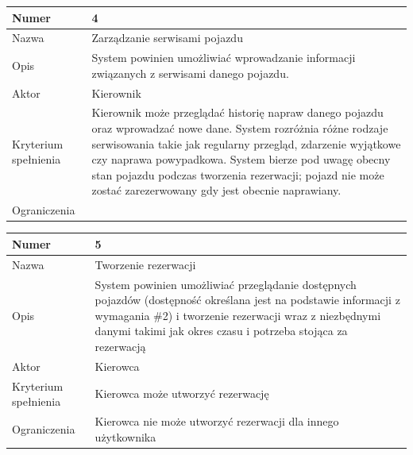 \documentclass[eng,printmode,openany]{mgr}
\begin{document}
	\begin{table}[H]
		\begin{tabularx}{\textwidth}{|l|X|}
			\hline
			Numer                & 4 \\ \hline
			Nazwa                & Zarządzanie serwisami pojazdu \\ \hline
			Opis                 & System powinien umożliwiać wprowadzanie informacji związanych z serwisami danego pojazdu. \\ \hline
			Aktor                & Kierownik \\ \hline
			Kryterium spełnienia & Kierownik może przeglądać historię napraw danego pojazdu oraz wprowadzać nowe dane. System rozróżnia różne rodzaje serwisowania takie jak regularny przegląd, zdarzenie wyjątkowe czy naprawa powypadkowa. System bierze pod uwagę obecny stan pojazdu podczas tworzenia rezerwacji; pojazd nie może zostać zarezerwowany gdy jest obecnie naprawiany. \\ \hline
			Ograniczenia         & \\ \hline
		\end{tabularx}
	\end{table}
	
	\begin{table}[H]
		\begin{tabularx}{\textwidth}{|l|X|}
			\hline
			Numer                & 5 \\ \hline
			Nazwa                & Tworzenie rezerwacji \\ \hline
			Opis                 & System powinien umożliwiać przeglądanie dostępnych pojazdów (dostępność określana jest na podstawie informacji z wymagania \#2) i tworzenie rezerwacji wraz z niezbędnymi danymi takimi jak okres czasu i potrzeba stojąca za rezerwacją\\ \hline
			Aktor                & Kierowca \\ \hline
			Kryterium spełnienia & Kierowca może utworzyć rezerwację \\ \hline
			Ograniczenia         & Kierowca nie może utworzyć rezerwacji dla innego użytkownika \\ \hline
		\end{tabularx}
	\end{table}
	
\end{document}
